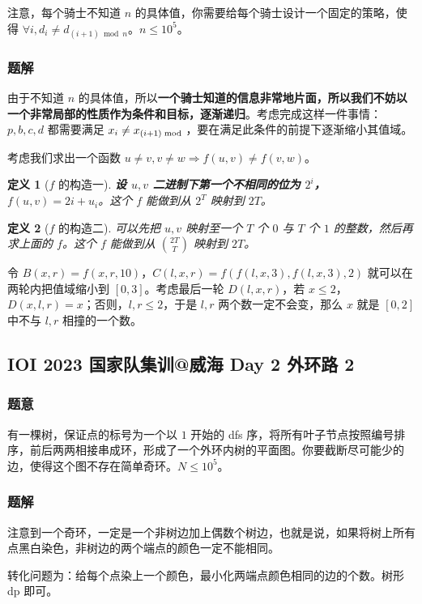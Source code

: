 \documentclass[12pt, a4paper, oneside]{ctexart}
\newtheorem{definition}{定义}[subsection]
\begin{document}
注意，每个骑士不知道 $n$ 的具体值，你需要给每个骑士设计一个固定的策略，使得 $\forall i,d_i\neq d_{(i+1)\bmod n}$。$n\le 10^5$。

\subsubsection{题解}

由于不知道 $n$ 的具体值，所以\textbf{一个骑士知道的信息非常地片面，所以我们不妨以一个非常局部的性质作为条件和目标，逐渐递归}。考虑完成这样一件事情：$p,b,c,d$ 都需要满足 $x_i\neq x_{(i+1)\bmod}$，要在满足此条件的前提下逐渐缩小其值域。

考虑我们求出一个函数 $u\neq v,v\neq w \Rightarrow f(u,v)\neq f(v,w)$。

\begin{definition}[$f$ 的构造一]
    \textbf{设 $u,v$ 二进制下第一个不相同的位为 $2^{i}$，$f(u,v)=2i+u_i$}。这个 $f$ 能做到从 $2^T$ 映射到 $2T$。
\end{definition}

\begin{definition}[$f$ 的构造二]
    可以先把 $u,v$ 映射至一个 $T$ 个 $0$ 与 $T$ 个 $1$ 的整数，然后再求上面的 $f$。这个 $f$ 能做到从 $\binom{2T}{T}$ 映射到 $2T$。
\end{definition}

令 $B(x,r)=f(x,r,10)$，$C(l,x,r)=f(f(l,x,3),f(l,x,3),2)$ 就可以在两轮内把值域缩小到 $[0,3]$。考虑最后一轮 $D(l,x,r)$，若 $x\le 2$，$D(x,l,r)=x$；否则，$l,r\le 2$，于是 $l,r$ 两个数一定不会变，那么 $x$ 就是 $[0,2]$ 中不与 $l,r$ 相撞的一个数。

\subsection{IOI 2023 国家队集训@威海 Day 2 外环路 2}

\subsubsection{题意}

有一棵树，保证点的标号为一个以 $1$ 开始的 dfs 序，将所有叶子节点按照编号排序，前后两两相接串成环，形成了一个外环内树的平面图。你要截断尽可能少的边，使得这个图不存在简单奇环。$N\le 10^5$。

\subsubsection{题解}

注意到一个奇环，一定是一个非树边加上偶数个树边，也就是说，如果将树上所有点黑白染色，非树边的两个端点的颜色一定不能相同。

转化问题为：给每个点染上一个颜色，最小化两端点颜色相同的边的个数。树形 dp 即可。
\end{document}
